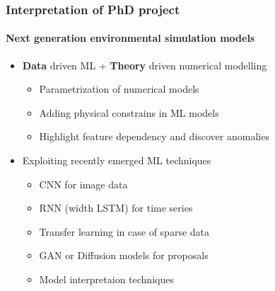 \documentclass[
	10pt, %
]{beamer}
\begin{document}
\begin{frame}
	\frametitle{Interpretation of PhD project}
	\framesubtitle{Next generation environmental simulation models}

	\begin{itemize}
		\item \textbf{Data} driven ML + \textbf{Theory} driven numerical modelling
		\begin{itemize}
			\item Parametrization of numerical models
			\item Adding physical constrains in ML models
			\item Highlight feature dependency and discover anomalies
		\end{itemize}
		
		
		\item Exploiting recently emerged ML techniques
		\begin{itemize}
			\item CNN for image data
			\item RNN (width LSTM) for time series
			\item Transfer learning in case of sparse data
			\item GAN or Diffusion models for proposals 
			\item Model interpretaion techniques
		\end{itemize}
	\end{itemize}
	

\end{frame}
\end{document}
